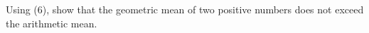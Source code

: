 Using (6), show that the geometric mean of two positive numbers does not exceed the arithmetic mean.\\